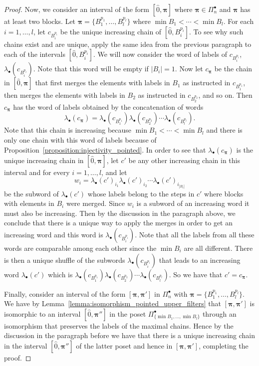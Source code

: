 \documentclass[11pt]{article}
\theoremstyle{definition}
\numberwithin{equation}{section}
\newcommand{\bpi}{\pmb{\pi}}
\begin{document}
\begin{proof}
Now, we consider an interval of the form $[\hat{0},\bpi]$ where $\bpi \in \Pi_n^{\bullet}$ and $\bpi$ has at least two blocks. Let $\bpi=\{B_1^{p_1},\dots,B_l^{p_l}\}$ where $\min B_1 <\cdots <\min B_l$. For each $i=1,\dots,l$,  let  $c_{B_i^{p_i}}$ be the unique increasing chain of $[\hat{0},B_i^{p_i}]$. To see why such  chains exist and are unique, apply the same idea from the previous paragraph to each of the intervals  $[\hat{0},B_i^{p_i}]$.  We will now consider the word of labels of  $c_{B_i^{p_i}}$,  $\lambda_{\bullet}(c_{B_i^{p_i}})$.  Note that this word will be empty if $|B_i|=1$. Now let $c_{\bpi}$ be the chain in $[\hat{0},\bpi]$ that first merges the elements with labels in $B_1$ as instructed in $c_{B_1^{p_1}}$, then merges the elements with labels in $B_2$ as instructed in $c_{B_2^{p_2}}$, and so on.  Then  $c_{\bpi}$ has the  word of labels obtained by the concatenation of words
$$\lambda_{\bullet}(c_{\bpi})=\lambda_{\bullet}(c_{B_1^{p_1}})\lambda_{\bullet}(c_{B_2^{p_2}})\cdots\lambda_{\bullet}(c_{B_l^{p_l}}).
$$
Note that this chain is increasing because $\min B_1 <\cdots <\min B_l$ and there is only one chain with this word of labels because of 
Proposition~\ref{proposition:injectivity_pointed}.  In order to see that $\lambda_{\bullet}(c_{\bpi})$ is the unique increasing chain in $[\hat{0},\bpi]$, let $c'$ be any other increasing chain in this interval and for every $i=1,\dots,l$, and let 
$$w_i=\lambda_{\bullet}(c')_{i_1}\lambda_{\bullet}(c')_{i_2}\cdots \lambda_{\bullet}(c')_{i_{|B_i|}}$$ be the subword 
of $\lambda_{\bullet}(c')$ whose labels belong to the steps in $c'$
where blocks with elements in $B_i$ were merged. Since $w_i$ is a subword of an increasing word it must also be increasing. Then by the discussion in the paragraph above, we conclude that there is a unique way to apply the merges in order to get an increasing word and this word is $\lambda_{\bullet}(c_{B_i^{p_i}})$. Note that all the labels from all these words are comparable among each other since the $\min B_i$ are all  different. There is then a unique shuffle of the subwords  $\lambda_{\bullet}(c_{B_i^{p_i}})$ that leads to an increasing word  $\lambda_{\bullet}(c')$ which is $\lambda_{\bullet}(c_{B_1^{p_1}})\lambda_{\bullet}(c_{B_2^{p_2}})\cdots\lambda_{\bullet}(c_{B_l^{p_l}})$. So we have that $c'=c_{\bpi}$. 

Finally, consider an interval of the form $[\bpi, \bpi']$ in $\Pi_n^{\bullet}$ with $\bpi=\{B_1^{p_1},\dots,B_l^{p_l}\}$. We have by Lemma~\ref{lemma:isomorphism_pointed_upper_filters} that $[\bpi, \bpi']$ is isomorphic to an interval $[\hat{0},\bpi'']$ in the poset $\Pi_{\{\min B_1, \dots, \min B_l\}}^{\bullet}$ through an isomorphism that preserves the labels of the maximal chains. Hence by the discussion in the paragraph before we have that there is a unique increasing chain in the interval  $[\hat{0},\bpi'']$ of the latter poset and hence in $[\bpi, \bpi']$, completing the proof.
\end{proof}
\end{document}
